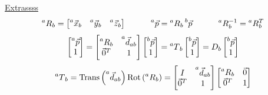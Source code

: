 \documentclass[twocolumn, 12pt]{article}    %
\begin{document}
\noindent\underline{Extrassss}
\begin{equation*}
    \prescript{a}{}{R}_b = \begin{bmatrix}
        \prescript{a}{}{\Vec{x}}_b & \prescript{a}{}{\Vec{y}}_b & \prescript{a}{}{\Vec{z}}_b 
    \end{bmatrix} \hspace{30pt} \prescript{a}{}{\Vec{p}} = \prescript{a}{}{R}_b \prescript{b}{}{\Vec{p}} \hspace{30pt} \prescript{a}{}{R}_b^{-1} = \prescript{a}{}{R}_b^T
\end{equation*}
\begin{equation*}
    \begin{bmatrix}
        \prescript{a}{}{\Vec{p}} \\ 1 
    \end{bmatrix} = \begin{bmatrix}
        \prescript{a}{}{R}_b & \prescript{a}{}{\Vec{d}}_{ab}\\ \Vec{0}^T & 1
    \end{bmatrix} \begin{bmatrix}
        \prescript{b}{}{\Vec{p}} \\ 1 
    \end{bmatrix}  = \prescript{a}{}{T}_b  \begin{bmatrix}
        \prescript{b}{}{\Vec{p}} \\ 1 
    \end{bmatrix} =  D_b  \begin{bmatrix}
        \prescript{b}{}{\Vec{p}} \\ 1 
    \end{bmatrix}
\end{equation*}
\begin{equation*}
    \prescript{a}{}{T}_b = \text{Trans}\left(\prescript{a}{}{\Vec{d}}_{ab}\right) \text{Rot}\left(\prescript{a}{}{R}_b\right) = \begin{bmatrix}
        I & \prescript{a}{}{\Vec{d}}_{ab} \\
        \Vec{0}^T & 1
    \end{bmatrix}\begin{bmatrix}
        \prescript{a}{}{R}_b & \Vec{0}\\ 
        \Vec{0}^T & 1
    \end{bmatrix}
\end{equation*}
\end{document}
